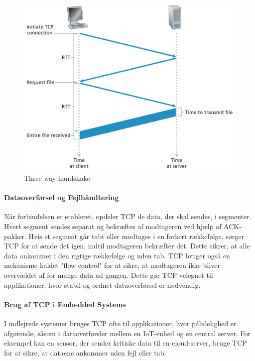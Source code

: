 \begin{figure}[!h]
	\centering
	\includegraphics{fig/fig27.png}
	\caption{Three-way handshake}
\end{figure}

\paragraph{Dataoverførsel og Fejlhåndtering}
Når forbindelsen er etableret, opdeler TCP de data, der skal sendes, i segmenter. Hvert segment sendes separat og bekræftes af modtageren ved hjælp af ACK-pakker. Hvis et segment går tabt eller modtages i en forkert rækkefølge, sørger TCP for at sende det igen, indtil modtageren bekræfter det. Dette sikrer, at alle data ankommer i den rigtige rækkefølge og uden tab.
\newline\newline\noindent
TCP bruger også en mekanisme kaldet "flow control" for at sikre, at modtageren ikke bliver overvældet af for mange data ad gangen. Dette gør TCP velegnet til applikationer, hvor stabil og ordnet dataoverførsel er nødvendig.

\paragraph{Brug af TCP i Embedded Systems}
I indlejrede systemer bruges TCP ofte til applikationer, hvor pålidelighed er afgørende, såsom i dataoverførsler mellem en IoT-enhed og en central server. For eksempel kan en sensor, der sender kritiske data til en cloud-server, bruge TCP for at sikre, at dataene ankommer uden fejl eller tab.

